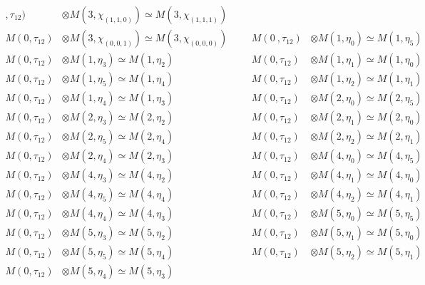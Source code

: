 \begin{align*}
,\tau_{12}) &\otimes M(3,\chi_{(1,1,0)}) \simeq M(3,\chi_{(1,1,1)})\\
M(0,\tau_{12}) &\otimes M(3,\chi_{(0,0,1)}) \simeq M(3,\chi_{(0,0,0)}) &&& M(0\
,\tau_{12}) &\otimes M(1,\eta_{0}) \simeq M(1,\eta_{5})\\
M(0,\tau_{12}) &\otimes M(1,\eta_{3}) \simeq M(1,\eta_{2}) &&& M(0,\tau_{12}) \
&\otimes M(1,\eta_{1}) \simeq M(1,\eta_{0})\\
M(0,\tau_{12}) &\otimes M(1,\eta_{5}) \simeq M(1,\eta_{4}) &&& M(0,\tau_{12}) \
&\otimes M(1,\eta_{2}) \simeq M(1,\eta_{1})\\
M(0,\tau_{12}) &\otimes M(1,\eta_{4}) \simeq M(1,\eta_{3}) &&& M(0,\tau_{12}) \
&\otimes M(2,\eta_{0}) \simeq M(2,\eta_{5})\\
M(0,\tau_{12}) &\otimes M(2,\eta_{3}) \simeq M(2,\eta_{2}) &&& M(0,\tau_{12}) \
&\otimes M(2,\eta_{1}) \simeq M(2,\eta_{0})\\
M(0,\tau_{12}) &\otimes M(2,\eta_{5}) \simeq M(2,\eta_{4}) &&& M(0,\tau_{12}) \
&\otimes M(2,\eta_{2}) \simeq M(2,\eta_{1})\\
M(0,\tau_{12}) &\otimes M(2,\eta_{4}) \simeq M(2,\eta_{3}) &&& M(0,\tau_{12}) \
&\otimes M(4,\eta_{0}) \simeq M(4,\eta_{5})\\
M(0,\tau_{12}) &\otimes M(4,\eta_{3}) \simeq M(4,\eta_{2}) &&& M(0,\tau_{12}) \
&\otimes M(4,\eta_{1}) \simeq M(4,\eta_{0})\\
M(0,\tau_{12}) &\otimes M(4,\eta_{5}) \simeq M(4,\eta_{4}) &&& M(0,\tau_{12}) \
&\otimes M(4,\eta_{2}) \simeq M(4,\eta_{1})\\
M(0,\tau_{12}) &\otimes M(4,\eta_{4}) \simeq M(4,\eta_{3}) &&& M(0,\tau_{12}) \
&\otimes M(5,\eta_{0}) \simeq M(5,\eta_{5})\\
M(0,\tau_{12}) &\otimes M(5,\eta_{3}) \simeq M(5,\eta_{2}) &&& M(0,\tau_{12}) \
&\otimes M(5,\eta_{1}) \simeq M(5,\eta_{0})\\
M(0,\tau_{12}) &\otimes M(5,\eta_{5}) \simeq M(5,\eta_{4}) &&& M(0,\tau_{12}) \
&\otimes M(5,\eta_{2}) \simeq M(5,\eta_{1})\\
M(0,\tau_{12}) &\otimes M(5,\eta_{4}) \simeq M(5,\eta_{3})\\
\end{align*}

